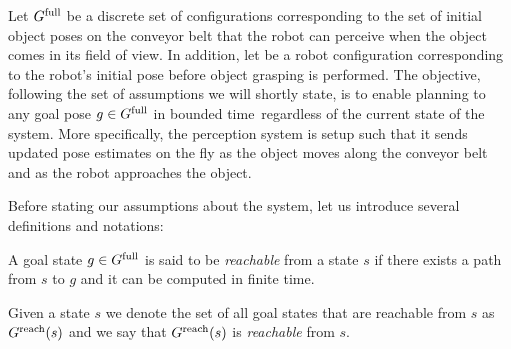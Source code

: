 \documentclass[conference]{IEEEtran}
\begin{document}
Let $G^{\textrm{full}}$ be a discrete set of configurations corresponding to the set of initial object poses on the conveyor belt that the robot can perceive when the object comes in its field of view. 
%
In addition, let \Shome be a robot configuration corresponding to the robot's initial pose before object grasping is performed.
%
The objective, following the set of assumptions we will shortly state, is to enable planning to any goal pose $ g \in G^{\textrm{full}}$ in bounded time~\Tbound regardless of the current state of the system.
More specifically, the perception system is setup such that it sends updated pose estimates on the fly as the object moves along the conveyor belt and as the robot approaches the object.   


Before stating our assumptions about the system, let us introduce several definitions and notations:
\begin{definition}
    A goal state $g \in G^{\textrm{full}}$ is said to be \emph{reachable} from a state $s$ if there exists a path from $s$ to $g$ and it can be computed in finite time.
\end{definition}

Given a state $s$ we denote the set of all goal states that are reachable from $s$ as $G^{\rm reach}(s)$ and we say that $G^{\rm reach}(s)$ is \emph{reachable} from $s$.

\end{document}
